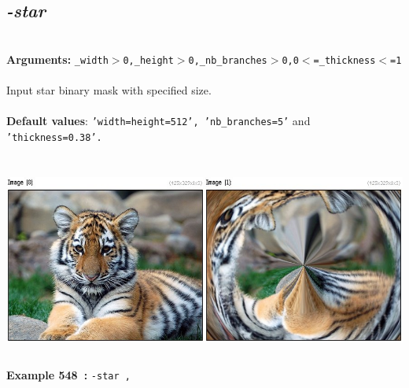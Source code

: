 \documentclass[a4paper,11pt,twoside]{book}
\begin{document}
\subsection{\emph{-star} }\vspace*{-0.5em}
~\\\textbf{Arguments: } 
{\small \texttt{\_width$>$0,\_height$>$0,\_nb\_branches$>$0,0$<$=\_thickness$<$=1}}\\~\\
Input star binary mask with specified size.
~\\~\\\textbf{Default values}: {\small \texttt{'width=height=512', 'nb\_branches=5'} and \texttt{'thickness=0.38'.}}
\begin{center}\includegraphics[keepaspectratio=true,height=7cm,width=\textwidth]{img/gmic_def548.jpg}\\
{\footnotesize \textbf{Example 548~:} \texttt{-star ,}}
\end{center}
\end{document}
